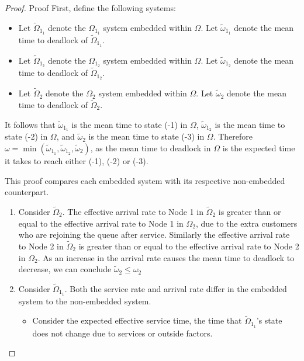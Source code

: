 \documentclass{article}
\numberwithin{equation}{section}
\begin{document}
\begin{proof}{Proof}
First, define the following systems:
\begin{itemize}
  \item Let $\widetilde{\Omega}_{1_1}$ denote the $\Omega_{1_1}$ system embedded within $\Omega$. Let $\widetilde{\omega}_{1_1}$ denote the mean time to deadlock of $\widetilde{\Omega}_{1_1}$.
  \item Let $\widetilde{\Omega}_{1_2}$ denote the $\Omega_{1_2}$ system embedded within $\Omega$. Let $\widetilde{\omega}_{1_2}$ denote the mean time to deadlock of $\widetilde{\Omega}_{1_2}$.
  \item Let $\widetilde{\Omega}_2$ denote the $\Omega_2$ system embedded within $\Omega$. Let $\widetilde{\omega}_2$ denote the mean time to deadlock of $\widetilde{\Omega}_2$.
\end{itemize}

It follows that $\widetilde{\omega}_{1_1}$ is the mean time to state (-1) in $\Omega$, $\widetilde{\omega}_{1_2}$ is the mean time to state (-2) in $\Omega$, and $\widetilde{\omega}_2$ is the mean time to state (-3) in $\Omega$.
Therefore $\omega = \min(\widetilde{\omega}_{1_1}, \widetilde{\omega}_{1_2}, \widetilde{\omega}_2)$, as the mean time to deadlock in $\Omega$ is the expected time it takes to reach either (-1), (-2) or (-3).

This proof compares each embedded system with its respective non-embedded counterpart.

\begin{enumerate}

\item Consider $\widetilde{\Omega}_2$.
The effective arrival rate to Node 1 in $\widetilde{\Omega}_2$ is greater than or equal to the effective arrival rate to Node 1 in $\Omega_2$, due to the extra customers who are rejoining the queue after service.
Similarly the effective arrival rate to Node 2 in $\widetilde{\Omega}_2$ is greater than or equal to the effective arrival rate to Node 2 in $\Omega_2$.
As an increase in the arrival rate causes the mean time to deadlock to decrease, we can conclude $\widetilde{\omega}_2 \leq \omega_2$

\item Consider $\widetilde{\Omega}_{1_1}$. Both the service rate and arrival rate differ in the embedded system to the non-embedded system.

\begin{itemize}

\item Consider the expected effective service time, the time that $\widetilde{\Omega}_{1_1}$'s state does not change due to services or outside factors.


\end{itemize}
\end{enumerate}
\end{proof}
\end{document}
